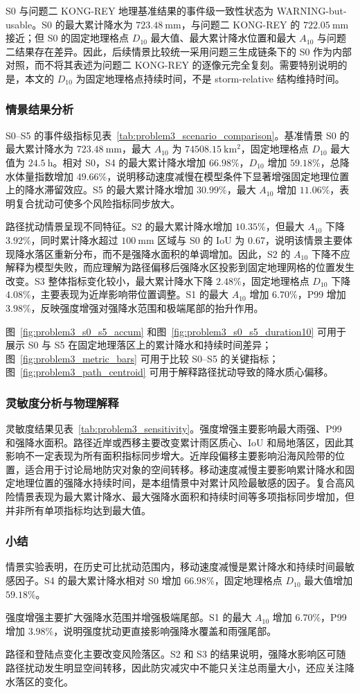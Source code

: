 S0 与问题二 KONG-REY 地理基准结果的事件级一致性状态为 WARNING-but-usable。S0 的最大累计降水为 $723.48\ \mathrm{mm}$，与问题二 KONG-REY 的 $722.05\ \mathrm{mm}$ 接近；但 S0 的固定地理格点 $D_{10}$ 最大值、最大累计降水位置和最大 $A_{10}$ 与问题二结果存在差异。因此，后续情景比较统一采用问题三生成链条下的 S0 作为内部对照，而不将其表述为问题二 KONG-REY 的逐像元完全复刻。需要特别说明的是，本文的 $D_{10}$ 为固定地理格点持续时间，不是 storm-relative 结构维持时间。

\subsubsection{情景结果分析}

S0--S5 的事件级指标见表~\ref{tab:problem3_scenario_comparison}。基准情景 S0 的最大累计降水为 $723.48\ \mathrm{mm}$，最大 $A_{10}$ 为 $74508.15\ \mathrm{km^2}$，固定地理格点 $D_{10}$ 最大值为 $24.5\ \mathrm{h}$。相对 S0，S4 的最大累计降水增加 $66.98\%$，$D_{10}$ 增加 $59.18\%$，总降水体量指数增加 $49.66\%$，说明移动速度减慢在模型条件下显著增强固定地理位置上的降水滞留效应。S5 的最大累计降水增加 $30.99\%$，最大 $A_{10}$ 增加 $11.06\%$，表明复合扰动可使多个风险指标同步放大。

路径扰动情景呈现不同特征。S2 的最大累计降水增加 $10.35\%$，但最大 $A_{10}$ 下降 $3.92\%$，同时累计降水超过 $100\ \mathrm{mm}$ 区域与 S0 的 IoU 为 0.67，说明该情景主要体现降水落区重新分布，而不是强降水面积的单调增加。因此，S2 的 $A_{10}$ 下降不应解释为模型失败，而应理解为路径偏移后强降水区投影到固定地理网格的位置发生改变。S3 整体指标变化较小，最大累计降水下降 $2.48\%$，固定地理格点 $D_{10}$ 下降 $4.08\%$，主要表现为近岸影响带位置调整。S1 的最大 $A_{10}$ 增加 $6.70\%$，P99 增加 $3.98\%$，反映强度增强对强降水范围和极端尾部的抬升作用。

图~\ref{fig:problem3_s0_s5_accum} 和图~\ref{fig:problem3_s0_s5_duration10} 可用于展示 S0 与 S5 在固定地理落区上的累计降水和持续时间差异；图~\ref{fig:problem3_metric_bars} 可用于比较 S0--S5 的关键指标；图~\ref{fig:problem3_path_centroid} 可用于解释路径扰动导致的降水质心偏移。

\subsubsection{灵敏度分析与物理解释}

灵敏度结果见表~\ref{tab:problem3_sensitivity}。强度增强主要影响最大雨强、P99 和强降水面积。路径近岸或西移主要改变累计雨区质心、IoU 和局地落区，因此其影响不一定表现为所有面积指标同步增大。近岸段偏移主要影响沿海风险带的位置，适合用于讨论局地防灾对象的空间转移。移动速度减慢主要影响累计降水和固定地理位置的强降水持续时间，是本组情景中对累计风险最敏感的因子。复合高风险情景表现为最大累计降水、最大强降水面积和持续时间等多项指标同步增加，但并非所有单项指标均达到最大值。

\subsubsection{小结}

情景实验表明，在历史可比扰动范围内，移动速度减慢是累计降水和持续时间最敏感因子。S4 的最大累计降水相对 S0 增加 $66.98\%$，固定地理格点 $D_{10}$ 最大值增加 $59.18\%$。

强度增强主要扩大强降水范围并增强极端尾部。S1 的最大 $A_{10}$ 增加 $6.70\%$，P99 增加 $3.98\%$，说明强度扰动更直接影响强降水覆盖和雨强尾部。

路径和登陆点变化主要改变风险落区。S2 和 S3 的结果说明，强降水影响区可随路径扰动发生明显空间转移，因此防灾减灾中不能只关注总雨量大小，还应关注降水落区的变化。
